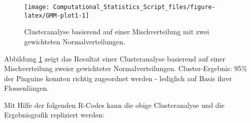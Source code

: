 \documentclass[
  ngerman,
]{book}
\begin{document}
\begin{figure}[h]

{\centering \texttt{[image: Computational\_Statistics\_Script\_files/figure-latex/GMM-plot1-1]} 

}

\caption{Clusteranalyse basierend auf einer  Mischverteilung mit zwei gewichteten Normalverteilungen.}\label{fig:GMM-plot1}
\end{figure}

Abbildung \ref{fig:GMM-plot1} zeigt das Resultat einer Clusteranalyse basierend auf einer Mischverteilung zweier gewichteter Normalverteilungen. Cluster-Ergebnis: 95\% der Pinguine konnten richtig zugeordnet werden - lediglich auf Basis ihrer Flossenlängen.

Mit Hilfe der folgenden R-Codes kann die obige Clusteranalyse und die Ergebnisgrafik repliziert werden:
\end{document}
